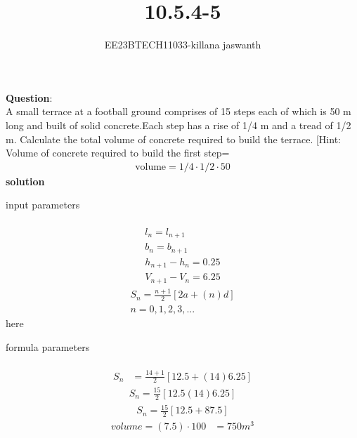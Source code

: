 \documentclass[journal,12pt,twocolumn]{IEEEtran}
\theoremstyle{remark}
\begin{document}

\vspace{3cm}

\title{10.5.4-5}
\author{EE23BTECH11033-killana jaswanth}
\maketitle
\newpage

\bigskip

\renewcommand{\thefigure}{\theenumi}
\renewcommand{\thetable}{\theenumi}
\textbf{Question}:\\
A small terrace at a football ground comprises of 15 steps each of which is 50
m long and built of solid concrete.Each step has a rise of 1/4 m and a tread of
1/2 m. Calculate the total volume of concrete required to build the terrace.
[Hint: Volume of concrete required to build the first step=\begin{align}
    \text{{volume}}=1/4 \cdot 1/2 \cdot 50 
\end{align}
\textbf{solution} 
\begin{table}[!ht]
 \centering
  
   \caption{input parameters}
   \label{tab:10.5.4.5}
   \end{table}
\begin{align}
\\l{_{n}}=l{_{n+1}}
\\b{_{n}}=b{_{n+1}}
\\h{_{n+1}}-h{_{n}}=0.25
\\V{_{n+1}}-V{_{n}}=6.25
\end{align}
\begin{align}
S_n = \frac{n+1}{2} [2a+(n)d]   
\\n=0,1,2,3,...
\end{align}
here\\\begin{table}[!ht]
 \centering
  
   \caption{formula parameters}
   \label{tab:10.5.4.5}
   \end{table}
\begin{align}\\S_n &= \frac{14+1}{2} [12.5+(14)6.25]
\end{align}
\begin{align}
S_n = \frac{15}{2}[12.5(14)6.25]
\end{align}
   \begin{align}
   S_n = \frac{15}{2} [12.5+87.5]
   \end{align}
   \begin{align}
   volume=(7.5) \cdot 100
   &=750m^3
   \end{align}
\end{document}

